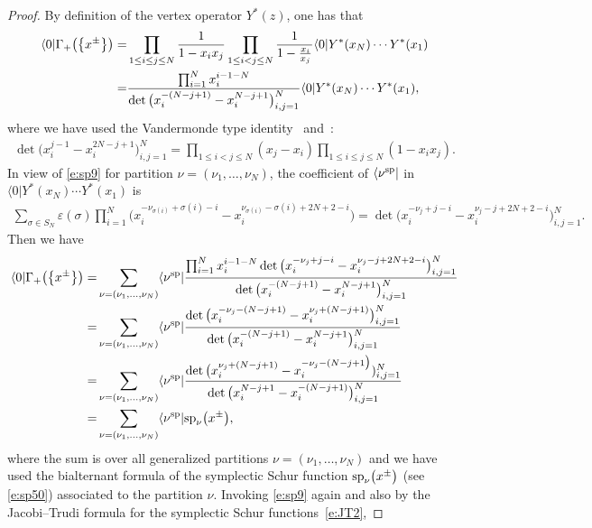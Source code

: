 \documentclass[10pt,a4paper]{amsart}
\numberwithin{equation}{section}
\begin{document}
\begin{proof}
By definition of the vertex operator $Y^*(z)$, one has that
\begin{align*}%
\notag\langle 0|\Gamma_+\big(\big\{x^{\pm}\big\}\big)=&\prod_{1\leq i\leq j\leq N}\frac{1}{1-x_ix_j}\prod_{1\leq i<j\leq N}\frac{1}{1-\frac{x_i}{x_j}}\langle 0|Y^*(x_N)\cdots Y^*(x_1)\\
=&\frac{\prod^{N}_{i=1}x^{i-1-N}_i}{\det\big(x^{-(N-j+1)}_i-x^{N-j+1}_i\big)^N_{i,j=1}}\langle 0|Y^*(x_N)\cdots Y^*(x_1),
\end{align*}
where we have used the Vandermonde type identity~\cite[formula~(4.6)]{JN2015} and~\cite[p.~229]{Wey1946}:
\begin{align*}%
\det\big(x^{j-1}_i-x^{2N-j+1}_i\big)^N_{i,j=1}=\prod_{1\leq i<j\leq N}(x_j-x_i)\prod_{1\leq i\leq j\leq N}(1-x_ix_j).
\end{align*}
In view of \eqref{e:sp9} for partition $\nu=(\nu_1,\dots,\nu_N)$, the coefficient of $\langle\nu^{\rm sp}|$ in $\langle 0|Y^*(x_N)\cdots Y^*(x_1)$ is
\begin{align*}
\sum_{\sigma\in S_N}\varepsilon(\sigma)\prod^{N}_{i=1}\big(x^{-\nu_{\sigma(i)}+\sigma(i)-i}_i-x^{\nu_{\sigma(i)}-\sigma(i)+2N+2-i}_i\big) = \det\big(x^{-\nu_j+j-i}_i-x^{\nu_j-j+2N+2-i}_i\big)^N_{i,j=1}.
\end{align*}
Then we have
\begin{align}\label{e:sp12}
\notag\langle 0|\Gamma_+\big(\big\{x^{\pm}\big\}\big)
=&\sum_{\nu=(\nu_1,\dots,\nu_N)}\langle\nu^{\rm sp}|\frac{\prod^{N}_{i=1}x^{i-1-N}_i\det\big(x^{-\nu_j+j-i}_i-x^{\nu_j-j+2N+2-i}_i\big)^N_{i,j=1}}{\det\big(x^{-(N-j+1)}_i-x^{N-j+1}_i\big)^N_{i,j=1}}\\
\notag=&\sum_{\nu=(\nu_1,\dots,\nu_N)}\langle\nu^{\rm sp}|\frac{\det\big(x^{-\nu_j-(N-j+1)}_i-x^{\nu_j+(N-j+1)}_i\big)^N_{i,j=1}}{\det\big(x^{-(N-j+1)}_i-x^{N-j+1}_i\big)^N_{i,j=1}}\\
\notag=&\sum_{\nu=(\nu_1,\dots,\nu_N)}\langle\nu^{\rm sp}|\frac{\det\big(x^{\nu_j+(N-j+1)}_i-x^{-\nu_j-(N-j+1\big)}_i)^N_{i,j=1}}{\det\big(x^{N-j+1}_i-x^{-(N-j+1)}_i\big)^N_{i,j=1}}\\
=&\sum_{\nu=(\nu_1,\dots,\nu_N)}\langle\nu^{\rm sp}|{\rm sp}_\nu\big(x^{\pm}\big),
\end{align}
where the sum is over all generalized partitions $\nu=(\nu_1,\dots,\nu_N)$ and we have used the bialternant formula of the symplectic Schur function ${\rm sp}_\nu\big(x^{\pm}\big)$ (see \eqref{e:sp50}) associated to the partition $\nu$. Invoking \eqref{e:sp9} again and also by the Jacobi--Trudi formula for the symplectic Schur functions~\eqref{e:JT2},

\end{proof}
\end{document}
